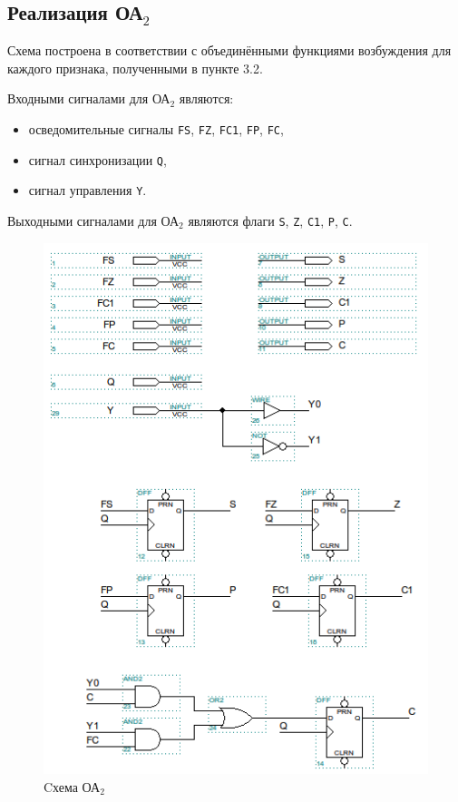\clearpage
\subsection{Реализация ОА${}_2$}

Схема построена в соответствии с объединёнными функциями возбуждения для каждого признака, полученными в пункте 3.2.

Входными сигналами для ОА${}_2$ являются:
\begin{itemize}
	\item осведомительные сигналы \texttt{FS}, \texttt{FZ}, \texttt{FC1}, \texttt{FP}, \texttt{FC},
	\item сигнал синхронизации \texttt{Q},
	\item сигнал управления \texttt{Y}.
\end{itemize}

Выходными сигналами для ОА${}_2$ являются флаги \texttt{S}, \texttt{Z}, \texttt{C1}, \texttt{P}, \texttt{C}.

\begin{figure}[H]
	\includegraphics[scale=0.6]{images/altera/rev2/oa2_WITH_CONTROL_SIGNAL.png}
	\caption{Cхема ОА$_{2}$}
	\label{figure:oa2log}
\end{figure}

